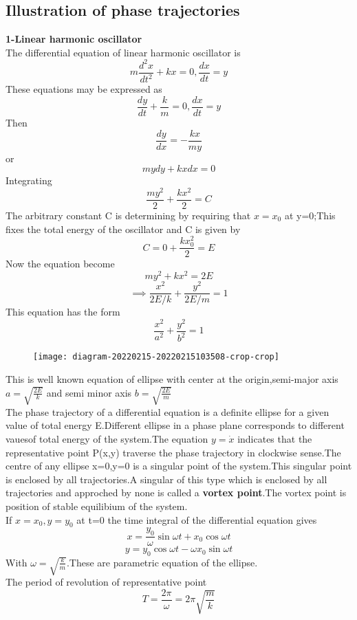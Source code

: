 \subsection{Illustration of phase trajectories}
\textbf{1-Linear harmonic oscillator}\\
The differential equation of linear harmonic oscillator is\\
$$m\frac{d^2x}{dt^2}+kx=0,\frac{dx}{dt}=y$$
These equations may be expressed as \\
$$\frac{dy}{dt}+\frac{k}{m}=0, \frac{dx}{dt}=y$$
Then $$\frac{dy}{dx}=-\frac{kx}{my}$$
or $$mydy+kxdx=0$$
Integrating\\
$$\frac{my^2}{2}+\frac{kx^2}{2}=C$$
The arbitrary constant C is determining by requiring that $x=x_0$ at y=0;This fixes the total energy of the oscillator and C is given by\\
$$ C=0+\frac{kx_0^2}{2}=E$$
Now the equation become 
$$my^2+kx^2=2E$$
$$\implies \frac{x^2}{2E/k}+\frac{y^2}{2E/m}=1$$
This equation has the form 
$$\frac{x^2}{a^2}+\frac{y^2}{b^2}=1$$
\begin{figure}[H]
	\centering
	\texttt{[image: diagram-20220215-20220215103508-crop-crop]}
	\caption{}
	\label{}
\end{figure}
This is well known equation of ellipse with center at the origin,semi-major axis $a=\sqrt{\frac{2E}{k}}$ and semi minor axis $b=\sqrt{\frac{2E}{m}}$\\
The phase trajectory of a differential equation is a definite ellipse for a given value of total energy E.Different ellipse in a phase plane corresponds to different vauesof total energy of the system.The equation $y=\dot{x}$ indicates that the representative point P(x,y) traverse the phase trajectory in clockwise sense.The centre of any ellipse x=0,y=0 is a singular point of the system.This singular point is enclosed by all trajectories.A singular of this type which is enclosed by all trajectories and approched by none is called a \textbf{vortex point}.The vortex point is position of stable equilibium of the system.\\
If $x=x_0,y=y_0$ at t=0 the time integral of the differential equation gives\\
$$x=\frac{y_0}{\omega}\sin \omega t+x_0\cos \omega t$$
$$y=y_0\cos \omega t-\omega x_0 \sin \omega t$$ 
With $ \omega=\sqrt{\frac{k}{m}}$.These are parametric equation of the ellipse.\\
The period of revolution of representative point \\
$$T=\frac{2 \pi }{\omega}=2\pi \sqrt{\frac{m}{k}}$$
